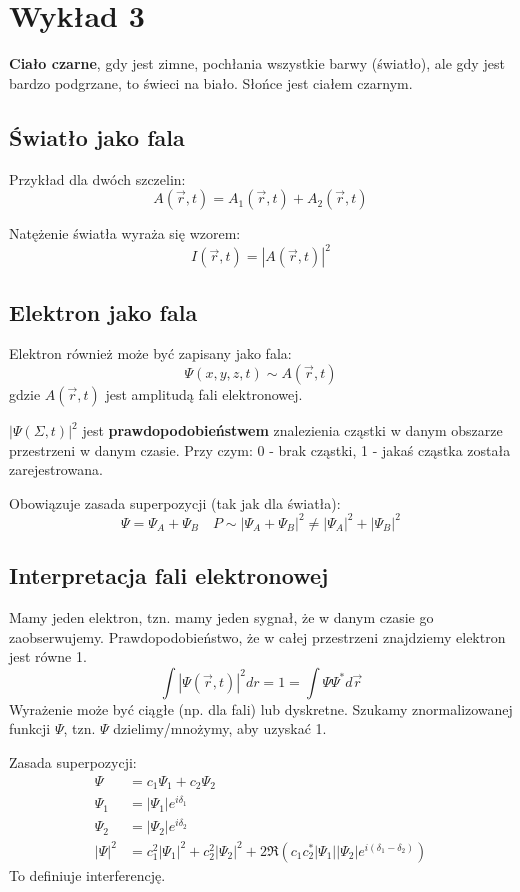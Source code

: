 \section{Wykład 3}

\textbf{Ciało czarne}, gdy jest zimne, pochłania wszystkie barwy (światło), ale gdy jest bardzo podgrzane, to świeci na biało.
Słońce jest ciałem czarnym.

\subsection{Światło jako fala}
Przykład dla dwóch szczelin:
\[
A(\vec{r}, t) = A_1(\vec{r}, t) + A_2(\vec{r}, t)
\]

Natężenie światła wyraża się wzorem:
\[
I(\vec{r}, t) = |A(\vec{r}, t)|^2
\]

\subsection{Elektron jako fala}
Elektron również może być zapisany jako fala:
\[
\Psi(x,y,z,t) \sim A(\vec{r}, t)
\]
gdzie $A(\vec{r},t)$ jest amplitudą fali elektronowej.

$|\Psi(\Sigma, t)|^2$ jest \textbf{prawdopodobieństwem} znalezienia cząstki w danym obszarze przestrzeni w danym czasie.
Przy czym: 0 - brak cząstki, 1 - jakaś cząstka została zarejestrowana.

Obowiązuje zasada superpozycji (tak jak dla światła):
\[
\Psi = \Psi_A + \Psi_B \quad P \sim |\Psi_A + \Psi_B|^2 \neq |\Psi_A|^2 + |\Psi_B|^2
\]

\subsection{Interpretacja fali elektronowej}
Mamy jeden elektron, tzn. mamy jeden sygnał, że w danym czasie go zaobserwujemy.
Prawdopodobieństwo, że w całej przestrzeni znajdziemy elektron jest równe 1.
\[
\int |\Psi(\vec{r}, t)|^2 dr = 1 = \int \Psi \Psi^* d\vec{r}
\]
Wyrażenie może być ciągłe (np. dla fali) lub dyskretne.
Szukamy znormalizowanej funkcji $\Psi$, tzn. $\Psi$ dzielimy/mnożymy, aby uzyskać 1.

Zasada superpozycji:
\begin{align*}
\Psi &= c_1 \Psi_1 + c_2 \Psi_2\\
\Psi_1 &= |\Psi_1| e^{i \delta_1}\\
\Psi_2 &= |\Psi_2| e^{i \delta_2}\\
|\Psi|^2 &= c_1^2 |\Psi_1|^2 + c_2^2 |\Psi_2|^2 + 2 \Re (c_1 c_2^* |\Psi_1| |\Psi_2| e^{i (\delta_1 - \delta_2)})
\end{align*}
To definiuje interferencję.


